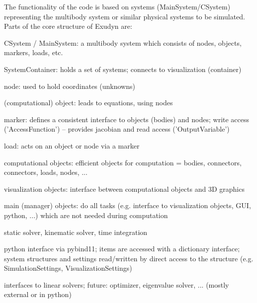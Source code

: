 The functionality of the code is based on systems (MainSystem/CSystem) representing the multibody system or similar physical systems to be simulated. Parts of the core structure of Exudyn are:
\bi
  \item CSystem / MainSystem: a multibody system which consists of nodes, objects, markers, loads, etc.
  \item SystemContainer: holds a set of systems; connects to visualization (container)
  \item node: used to hold coordinates (unknowns)
  \item (computational) object: leads to equations, using nodes
  \item marker: defines a consistent interface to objects (bodies) and nodes; write access ('AccessFunction') -- provides jacobian and read access ('OutputVariable')
  \item load: acts on an object or node via a marker
  \item computational objects: efficient objects for computation = bodies, connectors, connectors, loads, nodes, ...
  \item visualization objects: interface between computational objects and 3D graphics
  \item main (manager) objects: do all tasks (e.g. interface to visualization objects, GUI, python, ...) which are not needed during computation
  \item static solver, kinematic solver, time integration
  \item python interface via pybind11; items are accessed with a dictionary interface; system structures and settings read/written by direct access to the structure (e.g. SimulationSettings, VisualizationSettings)
  \item interfaces to linear solvers; future: optimizer, eigenvalue solver, ... (mostly external or in python)
\ei


